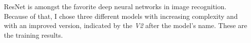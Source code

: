 ResNet is amongst the favorite deep neural networks in image recognition. Because of that, I chose three different models with increasing complexity and with an improved version, indicated by the \textit{V2} after the model's name. These are the training results.